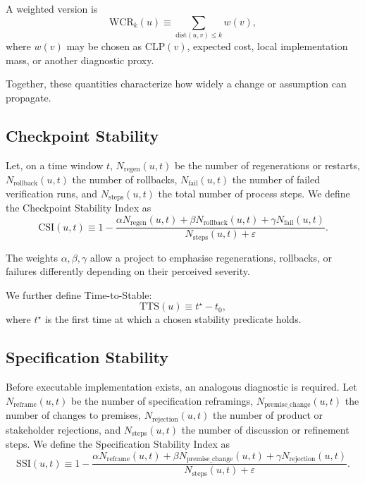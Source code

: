 \documentclass[twocolumn]{aastex701}
\begin{document}
A weighted version is
\begin{equation}
\mathrm{WCR}_k(u) \equiv
\sum_{\mathrm{dist}(u,v)\le k} w(v),
\end{equation}
where $w(v)$ may be chosen as $\mathrm{CLP}(v)$,
expected cost, local implementation mass, or another diagnostic proxy.

Together, these quantities characterize how widely
a change or assumption can propagate.

\subsection{Checkpoint Stability}

Let, on a time window $t$,
$N_{\mathrm{regen}}(u,t)$ be the number of regenerations or restarts,
$N_{\mathrm{rollback}}(u,t)$ the number of rollbacks,
$N_{\mathrm{fail}}(u,t)$ the number of failed verification runs,
and $N_{\mathrm{steps}}(u,t)$ the total number of process steps.
We define the Checkpoint Stability Index as
\begin{equation}
\mathrm{CSI}(u,t) \equiv
1 -
\frac{
\alpha N_{\mathrm{regen}}(u,t) +
\beta N_{\mathrm{rollback}}(u,t) +
\gamma N_{\mathrm{fail}}(u,t)
}{
N_{\mathrm{steps}}(u,t)+\varepsilon
}.
\end{equation}

The weights $\alpha,\beta,\gamma$ allow a project to emphasise
regenerations, rollbacks, or failures differently depending on their
perceived severity.

We further define Time-to-Stable:
\begin{equation}
\mathrm{TTS}(u) \equiv t^\star - t_0,
\end{equation}
where $t^\star$ is the first time at which a chosen stability predicate holds.

\subsection{Specification Stability}

Before executable implementation exists, an analogous diagnostic is required.
Let $N_{\mathrm{reframe}}(u,t)$ be the number of specification reframings,
$N_{\mathrm{premise\_change}}(u,t)$ the number of changes to premises,
$N_{\mathrm{rejection}}(u,t)$ the number of product or stakeholder rejections,
and $N_{\mathrm{steps}}(u,t)$ the number of discussion or refinement steps.
We define the Specification Stability Index as
\begin{equation}
\mathrm{SSI}(u,t) \equiv
1 -
\frac{
\alpha N_{\mathrm{reframe}}(u,t) +
\beta N_{\mathrm{premise\_change}}(u,t) +
\gamma N_{\mathrm{rejection}}(u,t)
}{
N_{\mathrm{steps}}(u,t)+\varepsilon
}.
\end{equation}
\end{document}
